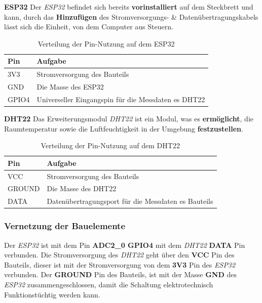 \documentclass[18pt]{article}
\begin{document}
\textbf{ESP32}
\newline
Der \textit{ESP32} befindet sich bereits \textbf{vorinstalliert} auf dem Steckbrett und kann, durch das \textbf{Hinzufügen} des Stromversorgungs- \& Datenübertragungskabels lässt sich die Einheit, von dem Computer aus Steuern.
\renewcommand{\arraystretch}{1.5}
\begin{table}[h!] %
\centering %
\caption{Verteilung der Pin-Nutzung auf dem ESP32} %
\label{tab:teil_1_steckbrett_esp32} %
\begin{tabular}{|l|l|} %
\hline
Pin & Aufgabe \\
\hline
3V3 & Stromversorgung des Bauteils \\
GND & Die Masse des ESP32 \\
GPIO4 & Universeller Eingangspin für die Messdaten es DHT22 \\
\hline %
\end{tabular}
\end{table}
\renewcommand{\arraystretch}{1}
\newline
\newline
\textbf{DHT22}
\newline
Das Erweiterungsmodul \textit{DHT22} ist ein Modul, was es \textbf{ermöglicht}, die Raumtemperatur sowie die Luftfeuchtigkeit in der Umgebung \textbf{festzustellen}.
\renewcommand{\arraystretch}{1.5}
\begin{table}[h!] %
\centering %
\caption{Verteilung der Pin-Nutzung auf dem DHT22} %
\label{tab:teil_1_steckbrett_dht22} %
\begin{tabular}{|l|l|} %
\hline
Pin & Aufgabe \\
\hline
VCC & Stromversorgung des Bauteils \\
GROUND & Die Masse des DHT22 \\
DATA & Datenübertragungsport für die Messdaten es Bauteils \\
\hline %
\end{tabular}
\end{table}
\renewcommand{\arraystretch}{1}

\subsubsection{Vernetzung der Bauelemente}
Der \textit{ESP32} ist mit dem Pin \textbf{ADC2\_0 GPIO4} mit dem \textit{DHT22} \textbf{DATA} Pin verbunden.
Die Stromversorgung des \textit{DHT22} geht über den \textbf{VCC} Pin des Bauteils, dieser ist mit der Stromversorgung von dem \textbf{3V3} Pin des \textit{ESP32} verbunden.
Der \textbf{GROUND} Pin des Bauteils, ist mit der Masse \textbf{GND} des \textit{ESP32} zusammengeschlossen, damit die Schaltung elektrotechnisch Funktionstüchtig werden kann.
\end{document}
